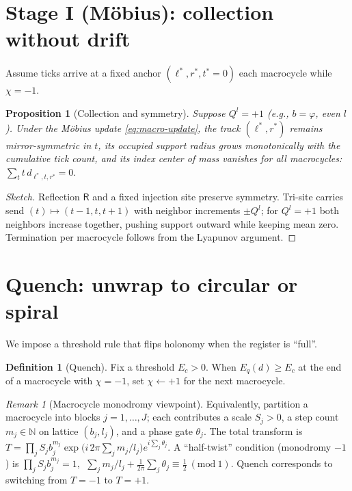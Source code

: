 \documentclass[11pt]{article}
\newtheorem{proposition}[theorem]{Proposition}
\theoremstyle{definition}
\newtheorem{definition}[theorem]{Definition}
\theoremstyle{remark}
\newtheorem{remark}[theorem]{Remark}
\newcommand{\N}{\mathbb{N}}
\begin{document}
\section{Stage I (M\"obius): collection without drift}\label{sec:mobius-collect}
Assume ticks arrive at a fixed anchor $(\ell^{*},r^{*},t^{*}=0)$ each macrocycle while $\chi=-1$.

\begin{proposition}[Collection and symmetry]
Suppose $Q^l=+1$ (e.g., $b=\varphi$, even $l$). Under the M\"obius update \eqref{eq:macro-update}, the track $(\ell^{*},r^{*})$ remains mirror-symmetric in $t$, its occupied support radius grows monotonically with the cumulative tick count, and its index center of mass vanishes for all macrocycles:
\(
\sum_t t\, d_{\ell^{*},t,r^{*}}=0.
\)
\end{proposition}

\begin{proof}[Sketch]
Reflection $\mathsf R$ and a fixed injection site preserve symmetry. Tri-site carries send $(t)\mapsto (t-1,t,t+1)$ with neighbor increments $\pm Q^l$; for $Q^l=+1$ both neighbors increase together, pushing support outward while keeping mean zero. Termination per macrocycle follows from the Lyapunov argument.
\end{proof}

\section{Quench: unwrap to circular or spiral}\label{sec:quench}
We impose a threshold rule that flips holonomy when the register is ``full''.

\begin{definition}[Quench]
Fix a threshold $E_c>0$. When $E_q(d)\ge E_c$ at the end of a macrocycle with $\chi=-1$, set $\chi\leftarrow +1$ for the next macrocycle.
\end{definition}

\begin{remark}[Macrocycle monodromy viewpoint]
Equivalently, partition a macrocycle into blocks $j=1,\dots,J$; each contributes a scale $S_j>0$, a step count $m_j\in\N$ on lattice $(b_j,l_j)$, and a phase gate $\theta_j$. The total transform is
\(
T=\prod_j S_j b_j^{m_j}\exp\big(i\,2\pi\sum_j m_j/l_j\big)e^{i\sum_j\theta_j}.
\)
A ``half-twist'' condition (monodromy $-1$) is
\(
\prod_j S_j b_j^{m_j}=1,\ \ \sum_j m_j/l_j + \frac{1}{2\pi}\sum_j\theta_j\equiv \tfrac12 \ (\mathrm{mod}\ 1).
\)
Quench corresponds to switching from $T=-1$ to $T=+1$.
\end{remark}
\end{document}
